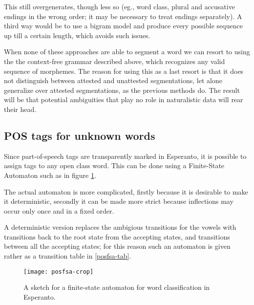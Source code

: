 \documentclass[10pt,a4paper]{article}
\begin{document}
This still overgenerates, though less so (eg., word class, plural and
accusative endings in the wrong order; it may be necessary to treat endings
separately). A third way would be to use a bigram model and produce every
possible sequence up till a certain length, which avoids such issues.

When none of these approaches are able to segment a word we can resort to
using the the context-free grammar described above, which recognizes any valid
sequence of morphemes. The reason for using this as a last resort is that it
does not distinguish between attested and unattested segmentations, let alone
generalize over attested segmentations, as the previous methods do. The result
will be that potential ambiguities that play no role in naturalistic data will
rear their head.

\subsection{POS tags for unknown words}

Since part-of-speech tags are transparently marked in Esperanto, it is
possible to assign tags to any open class word. This can be done using a
Finite-State Automaton such as in figure \ref{posfsa}.

The actual automaton is more complicated, firstly because it is
desirable to make it deterministic, secondly it can be made more strict because
inflections may occur only once and in a fixed order.

A deterministic version replaces the ambigious transitions for the vowels with
transitions back to the root state from the accepting states, and transitions
between all the accepting states; for this reason such an automaton is given rather as
a transition table in \ref{posfsa-tab}.

\begin{figure}
\centering
\texttt{[image: posfsa-crop]}
\caption{A sketch for a finite-state automaton for word classification in
Esperanto.}
\label{posfsa}
\end{figure}
\end{document}
